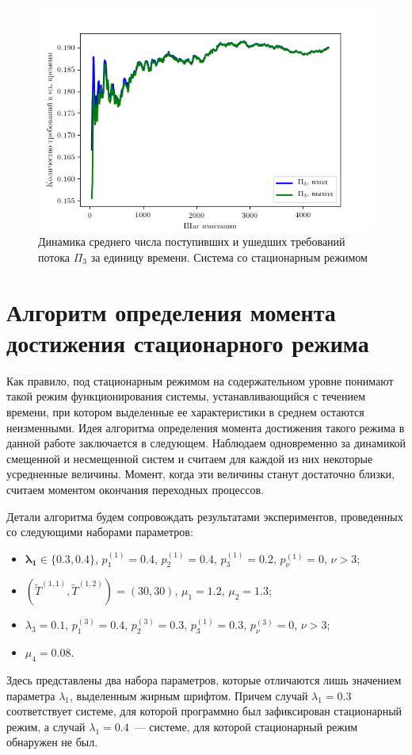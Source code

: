 \begin{figure}[t]
\centering
\includegraphics[scale=1]{Dissertation/Work_structured/Pictures/pic_inputOutputSecondFlow_stationar.png}
\caption{Динамика среднего числа поступивших и ушедших требований потока $\Pi_3$ за единицу времени. Система со стационарным режимом}
\label{Experiment:inputOutputSecondFlow:stationar}
\end{figure}

\section{Алгоритм определения момента достижения стационарного режима}
Как правило, под стационарным режимом на содержательном уровне понимают такой режим функционирования системы, устанавливающийся с течением времени, при котором выделенные ее характеристики в среднем остаются неизменными. Идея алгоритма определения момента достижения  такого режима в данной работе заключается в следующем. Наблюдаем одновременно за динамикой смещенной и несмещенной систем и считаем для каждой из них некоторые усредненные величины. Момент, когда эти величины станут достаточно близки, считаем моментом окончания переходных процессов. 

Детали алгоритма будем сопровождать результатами экспериментов, проведенных со следующими наборами параметров:
\begin{itemize}
    \item $\boldsymbol{\lambda_1\in \{0.3, 0.4\}}$, $p_{1}^{(1)}=0.4$, $p_{2}^{(1)}=0.4$, $p_{3}^{(1)}=0.2$, $p_{\nu}^{(1)}=0$, $\nu > 3$;
    \item $(\widetilde{T}^{(1,1)}, \widetilde{T}^{(1,2)})=(30,30)$, $\mu_1 = 1.2$, $\mu_2 = 1.3$;
    \item $\lambda_3=0.1$, $p_{1}^{(3)}=0.4$, $p_{2}^{(3)}=0.3$, $p_{3}^{(1)}=0.3$, $p_{\nu}^{(3)}=0$, $\nu > 3$;
        \item $\mu_4= 0.08$.
\end{itemize}
Здесь представлены два набора параметров, которые отличаются лишь значением параметра $\lambda_1$, выделенным жирным шрифтом. Причем случай $\lambda_1=0.3$ соответствует системе, для которой программно был зафиксирован стационарный режим, а случай $\lambda_1=0.4$~--- системе, для которой стационарный режим обнаружен не был.

